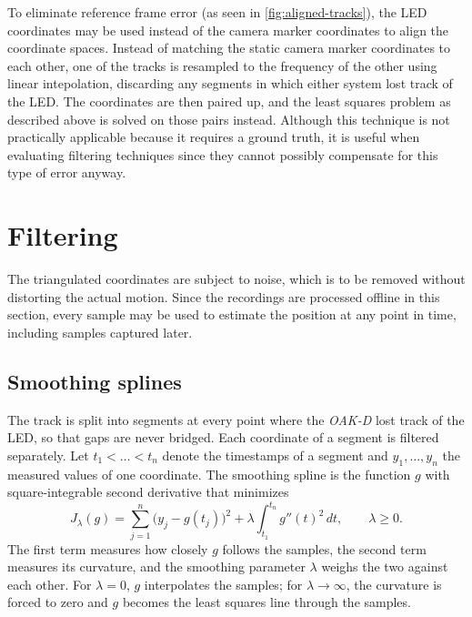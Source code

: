 \documentclass{siamart251216}
\begin{document}
To eliminate reference frame error (as seen in \cref{fig:aligned-tracks}), the LED coordinates may be used instead of the camera marker coordinates to align the coordinate spaces.
Instead of matching the static camera marker coordinates to each other, one of the tracks is resampled to the frequency of the other using linear intepolation, discarding any segments in which either system lost track of the LED.
The coordinates are then paired up, and the least squares problem as described above is solved on those pairs instead.
Although this technique is not practically applicable because it requires a ground truth, it is useful when evaluating filtering techniques since they cannot possibly compensate for this type of error anyway.

\section{Filtering}
\label{sec:filtering}

The triangulated coordinates are subject to noise, which is to be removed without distorting the actual motion.
Since the recordings are processed offline in this section, every sample may be used to estimate the position at any point in time, including samples captured later.

\subsection{Smoothing splines}

The track is split into segments at every point where the \emph{OAK-D} lost track of the LED, so that gaps are never bridged.
Each coordinate of a segment is filtered separately.
Let $t_1 < \dots < t_n$ denote the timestamps of a segment and $y_1, \dots, y_n$ the measured values of one coordinate.
The smoothing spline is the function $g$ with square-integrable second derivative that minimizes
\begin{equation}
  \label{eq:spline-objective}
  J_\lambda(g) = \sum_{j=1}^{n} \bigl(y_j - g(t_j)\bigr)^2 + \lambda \int_{t_1}^{t_n} g''(t)^2 \, dt,
  \qquad \lambda \geq 0.
\end{equation}
The first term measures how closely $g$ follows the samples, the second term measures its curvature, and the smoothing parameter $\lambda$ weighs the two against each other.
For $\lambda = 0$, $g$ interpolates the samples; for $\lambda \to \infty$, the curvature is forced to zero and $g$ becomes the least squares line through the samples.
\end{document}
